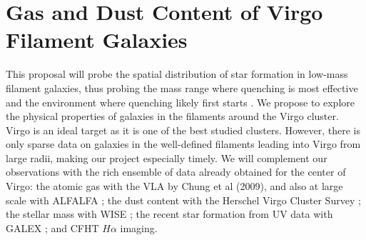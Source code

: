 \documentclass[11pt, preprint]{aastex}
\newcommand{\ha}{$H\alpha$}
\begin{document}
\vspace*{-.8cm}
\section{Gas and Dust Content of Virgo Filament Galaxies}
\vspace*{-.4cm}
This proposal will probe the spatial distribution of star formation in
 low-mass filament galaxies, thus probing the mass range where quenching
 is most effective and the environment where quenching likely first starts \citep{cybulski14}. 
 We propose to explore the physical properties of
galaxies in the filaments around the Virgo cluster.   
Virgo is an ideal
target as it is one of the best studied clusters.  However, there is
only sparse data on galaxies in the well-defined filaments leading
into Virgo from large radii, making our project especially timely.  We will complement our observations with the rich
ensemble of data already obtained for the center of Virgo: the atomic
gas with the VLA by Chung
et al (2009), and also at large scale with ALFALFA \citep{giovanelli05}; the
dust content with the Herschel Virgo Cluster Survey \citep{davies10};
the stellar mass with WISE \citep{ferrarese12}; the recent star formation
from UV data with GALEX \citep{boselli11}; and CFHT $H\alpha$ imaging.









\end{document}
